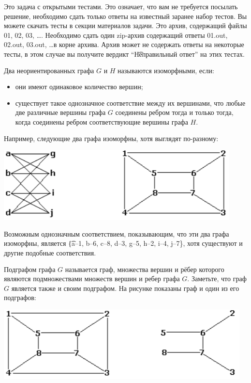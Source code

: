 Это задача с открытыми тестами. Это означает, что вам не требуется посылать решение, необходимо сдать только ответы на известный заранее набор тестов. Вы можете скачать тесты в секции материалов задачи. Это архив, содержащий файлы 01, 02, 03, \dots. Необходимо сдать один zip-архив содержащий ответы 01.out, 02.out, 03.out, \dots в корне архива. Архив может не содержать ответы на некоторые тесты, в этом случае вы получите вердикт ``\t{Неправильный ответ}'' на этих тестах.


Два неориентированных графа $G$ и $H$ называются изоморфными, если:

\begin{itemize}
    \item они имеют одинаковое количество вершин;
    \item существует такое однозначное соответствие между их вершинами,
    что любые две различные вершины графа $G$ соединены ребром
    тогда и только тогда, когда соединены ребром соответствующие
    вершины графа $H$.
\end{itemize}

Например, следующие два графа изоморфны, хотя выглядят по-разному:

\begin{center}
\includegraphics{pic1.png}
\end{center}

Возможным однозначным соответствием, показывающим, что эти два графа
изоморфны, является \t{\{a--1, b--6, c--8, d--3, g--5, h--2, i--4, j--7\}},
хотя существуют и другие подобные соответствия.

Подграфом графа $G$ называется граф, множества вершин и рёбер которого
являются подмножествами множеств вершин и ребер графа $G$.
Заметьте, что граф $G$ является также и своим подграфом.
На рисунке показаны граф и один из его подграфов:

\begin{center}
\includegraphics{pic2.png}
\end{center}

